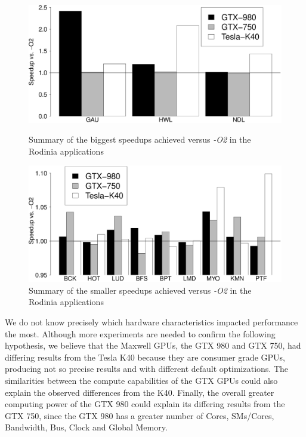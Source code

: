 \begin{figure}[htpb]
    \begin{minipage}{.48\textwidth}
        \centering
        \includegraphics[scale=.15]{./images/RodiniaSummary.eps}
        \caption{Summary of the biggest speedups achieved versus \emph{-O2} in the Rodinia applications}
        \label{fig:rodiniasummary}
    \end{minipage}%
    \hfill
    \begin{minipage}{.48\textwidth}
        \centering
        \includegraphics[scale=.15]{./images/RodiniaSummary_small.eps}
        \caption{Summary of the smaller speedups achieved versus \emph{-O2} in the Rodinia applications}
        \label{fig:rodiniasummarysmall}
    \end{minipage}%
\end{figure}

We do not know precisely which hardware characteristics impacted performance
the most.  Although more experiments are needed to confirm the following
hypothesis, we believe that the Maxwell GPUs, the GTX 980 and GTX 750, had
differing results from the Tesla K40 because they are consumer grade GPUs,
producing not so precise results and with different default optimizations. The
similarities between the compute capabilities of the GTX GPUs could also
explain the observed differences from the K40. Finally, the overall greater
computing power of the GTX 980 could explain its differing results from the GTX
750, since the GTX 980 has a greater number of Cores, SMs/Cores, Bandwidth,
Bus, Clock and Global Memory.

